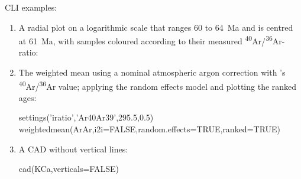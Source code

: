 \begin{refsection}
\noindent CLI examples:

\begin{enumerate}

\item A radial plot on a logarithmic scale that ranges 60 to 64~Ma and
  is centred at 61~Ma, with samples coloured according to their
  measured \textsuperscript{40}Ar/\textsuperscript{36}Ar-ratio:


\item The weighted mean using a nominal atmospheric argon correction
  with \citet{nier1950}'s
  \textsuperscript{40}Ar/\textsuperscript{36}Ar value; applying the
  random effects model and plotting the ranked ages:
  
\begin{script}
settings('iratio','Ar40Ar39',295.5,0.5)
weightedmean(ArAr,i2i=FALSE,random.effects=TRUE,ranked=TRUE)
\end{script}

\item A CAD without vertical lines:

\begin{console}
cad(KCa,verticals=FALSE)
\end{console}
  
\end{enumerate}

\printbibliography[heading=subbibliography]

\end{refsection}
